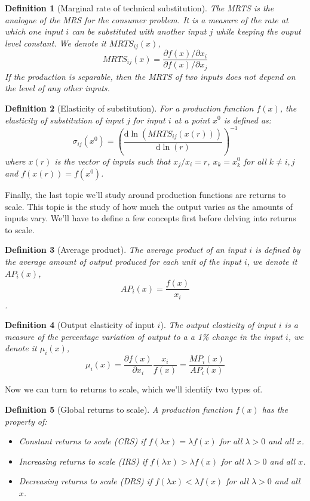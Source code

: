 \documentclass[12pt]{report}
\def\D{\mathrm{d}}
\newtheorem{definition}{Definition}[chapter]
\begin{document}
\begin{definition}[Marginal rate of technical substitution]
The MRTS is the analogue of the MRS for the consumer problem. It is a measure of the rate at which one input $i$ can be substituted with another input $j$ while keeping the ouput level constant. We denote it $MRTS_{ij}(x)$, $$MRTS_{ij}(x) = \frac{\partial f(x)/\partial x_i}{\partial f(x)/\partial x_j} $$ If the production is separable, then the MRTS of two inputs does not depend on the level of any other inputs.
\end{definition}

\begin{definition}[Elasticity of substitution]
For a production function $f(x)$, the elasticity of substitution of input $j$ for input $i$ at a point $x^0$ is defined as: $$\sigma_{ij}(x^0) = \left(\frac{\D\ln(MRTS_{ij}(x(r)))}{\D\ln(r)}\right)^{-1} $$ where $x(r)$ is the vector of inputs such that $x_j/x_i = r$, $x_k = x_k^0$ for all $k\neq i,j$ and $f(x(r)) = f(x^0)$.
\end{definition}


Finally, the last topic we'll study around production functions are returns to scale. This topic is the study of how much the output varies as the amounts of inputs vary. We'll have to define a few concepts first before delving into returns to scale.

\begin{definition}[Average product]
The average product of an input $i$ is defined by the average amount of output produced for each unit of the input $i$, we denote it $AP_i(x)$, $$AP_i(x) = \frac{f(x)}{x_i} $$.
\end{definition}

\begin{definition}[Output elasticity of input $i$]
The output elasticity of input $i$ is a measure of the percentage variation of output to a a 1\% change in the input $i$, we denote it $\mu_i(x)$, $$\mu_i(x) = \frac{\partial f(x)}{\partial x_i}\frac{x_i}{f(x)} = \frac{MP_i(x)}{AP_i(x)} $$
\end{definition}

Now we can turn to returns to scale, which we'll identify two types of.

\begin{definition}[Global returns to scale]
A production function $f(x)$ has the property of:\begin{itemize}
\item Constant returns to scale (CRS) if $f(\lambda x) = \lambda f(x)$ for all $\lambda > 0$ and all $x$.
\item Increasing returns to scale (IRS) if $f(\lambda x) > \lambda f(x)$ for all $\lambda > 0$ and all $x$.
\item Decreasing returns to scale (DRS) if $f(\lambda x) < \lambda f(x)$ for all $\lambda > 0$ and all $x$.
\end{itemize}
\end{definition}
\end{document}
